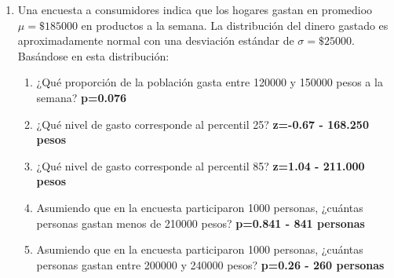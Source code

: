 \documentclass[letterpaper]{article}
\begin{document}
\begin{enumerate}
\item Una encuesta a consumidores indica que los hogares gastan en promedioo $\mu=\$ 185000$ en productos a la semana. La distribución del dinero gastado es aproximadamente normal con una desviación estándar de $\sigma=\$ 25000$. Basándose en esta distribución:
\begin{enumerate}
	\item ¿Qué proporción de la población gasta entre 120000 y 150000 pesos a la semana? {\bf p=0.076}
	\item ¿Qué nivel de gasto corresponde al percentil 25? {\bf z=-0.67 - 168.250 pesos}
	\item ¿Qué nivel de gasto corresponde al percentil 85? {\bf z=1.04 - 211.000 pesos}
	\item Asumiendo que en la encuesta participaron 1000 personas, ¿cuántas personas gastan menos de 210000 pesos? {\bf p=0.841 - 841 personas}
	\item Asumiendo que en la encuesta participaron 1000 personas, ¿cuántas personas gastan entre 200000 y 240000 pesos? {\bf p=0.26 - 260 personas}
\end{enumerate} 
\end{enumerate}
\end{document}
